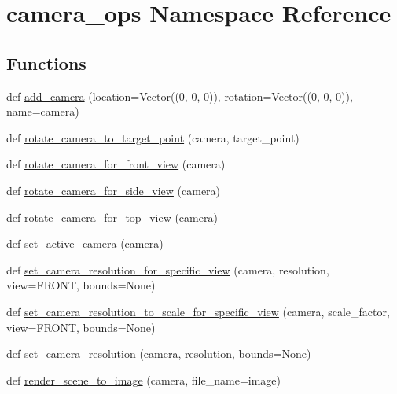 \hypertarget{namespacecamera__ops}{}\section{camera\+\_\+ops Namespace Reference}
\label{namespacecamera__ops}
\subsection*{Functions}
\begin{DoxyCompactItemize}
\item 
def \hyperlink{namespacecamera__ops_aff8f1b741160e2a06cae616cdb53b95a}{add\+\_\+camera} (location=Vector((0, 0, 0)), rotation=Vector((0, 0, 0)), name=\textquotesingle{}camera\textquotesingle{})
\item 
def \hyperlink{namespacecamera__ops_a44b28a34f85e1a83028865a0f11616fe}{rotate\+\_\+camera\+\_\+to\+\_\+target\+\_\+point} (camera, target\+\_\+point)
\item 
def \hyperlink{namespacecamera__ops_a94ee825e5994f76634c3e911e3fd6489}{rotate\+\_\+camera\+\_\+for\+\_\+front\+\_\+view} (camera)
\item 
def \hyperlink{namespacecamera__ops_aee12303ca5e41f499a7a48290c33f348}{rotate\+\_\+camera\+\_\+for\+\_\+side\+\_\+view} (camera)
\item 
def \hyperlink{namespacecamera__ops_a2f87aae73015b2df942ea8c7ee30b2ac}{rotate\+\_\+camera\+\_\+for\+\_\+top\+\_\+view} (camera)
\item 
def \hyperlink{namespacecamera__ops_a02108f8f64c92640022f536a4af01c37}{set\+\_\+active\+\_\+camera} (camera)
\item 
def \hyperlink{namespacecamera__ops_a4a83c4e5821a85b1c5549f2ebb975d0d}{set\+\_\+camera\+\_\+resolution\+\_\+for\+\_\+specific\+\_\+view} (camera, resolution, view=\textquotesingle{}F\+R\+O\+NT\textquotesingle{}, bounds=None)
\item 
def \hyperlink{namespacecamera__ops_a5fc0416d5207989ea97456d828285e0f}{set\+\_\+camera\+\_\+resolution\+\_\+to\+\_\+scale\+\_\+for\+\_\+specific\+\_\+view} (camera, scale\+\_\+factor, view=\textquotesingle{}F\+R\+O\+NT\textquotesingle{}, bounds=None)
\item 
def \hyperlink{namespacecamera__ops_a7f914fff58bd089d5ce31d8598c2a064}{set\+\_\+camera\+\_\+resolution} (camera, resolution, bounds=None)
\item 
def \hyperlink{namespacecamera__ops_ac39cb449acdd5117d4e9cc8d6d680f40}{render\+\_\+scene\+\_\+to\+\_\+image} (camera, file\+\_\+name=\textquotesingle{}image\textquotesingle{})

\end{DoxyCompactItemize}
